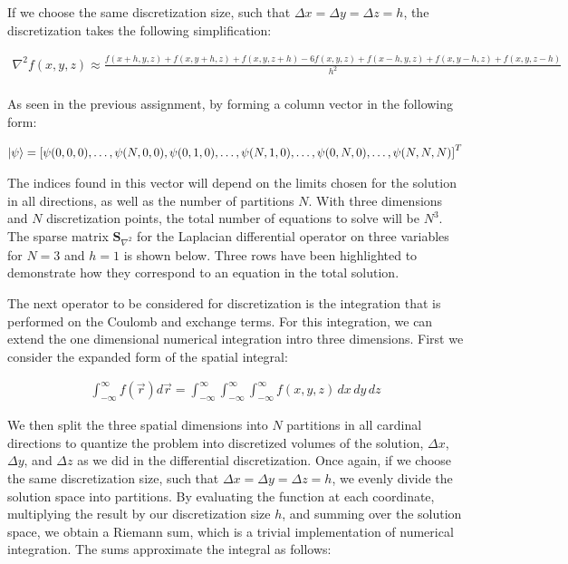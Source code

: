 \documentclass[10pt, oneside, letterpaper]{article}
\begin{document}
If we choose the same discretization size, such that $\Delta x = \Delta y = \Delta z = h$, the discretization takes the following simplification:

\begin{align*}
  \nabla^2f(x, y, z) \approx \frac{f(x+h,y,z) + f(x,y+h,z) + f(x,y,z+h) - 6f(x, y, z) + f(x-h,y,z) + f(x,y-h,z) + f(x,y,z-h)}{h^2}\\
\end{align*}

As seen in the previous assignment, by forming a column vector in the following form:

\begin{align*}
  \ket{\psi} = \left[\psi(0,0,0), \hdots ,\psi(N,0,0),\psi(0,1,0),\hdots,\psi(N,1,0),\hdots,\psi(0,N,0),\hdots,\psi(N,N,N)\right]^T
\end{align*}

The indices found in this vector will depend on the limits chosen for the solution in all directions, as well as the number of partitions $N$. With three dimensions and $N$ discretization points, the total number of equations to solve will be $N^3$. The sparse matrix $\bm{S}_{\nabla^2}$ for the Laplacian differential operator on three variables for $N=3$ and $h=1$ is shown below. Three rows have been highlighted to demonstrate how they correspond to an equation in the total solution.

\newpage


The next operator to be considered for discretization is the integration that is performed on the Coulomb and exchange terms. For this integration, we can extend the one dimensional numerical integration intro three dimensions. First we consider the expanded form of the spatial integral:

\begin{align*}
  \int_{-\infty}^{\infty} f(\vec{r})d\vec{r} = \int_{-\infty}^{\infty}\int_{-\infty}^{\infty}\int_{-\infty}^{\infty}f(x,y,z)\,dx\,dy\,dz
\end{align*}

We then split the three spatial dimensions into $N$ partitions in all cardinal directions to quantize the problem into discretized volumes of the solution, $\Delta x$, $\Delta y$, and $\Delta z$ as we did in the differential discretization. Once again, if we choose the same discretization size, such that $\Delta x = \Delta y = \Delta z = h$, we evenly divide the solution space into partitions. By evaluating the function at each coordinate, multiplying the result by our discretization size $h$, and summing over the solution space, we obtain a Riemann sum, which is a trivial implementation of numerical integration. The sums approximate the integral as follows:
\end{document}
